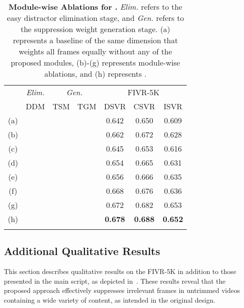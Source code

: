 \documentclass[10pt,twocolumn,letterpaper]{article}
\newcommand{\cmark}{\ding{51}}
\begin{document}
    \begin{table}[!t] \footnotesize
        \centering
        \begin{tabular}{c|ccc|ccc}
            \cmidrule[\heavyrulewidth]{1-7}
            \morecmidrules
            \cmidrule[\heavyrulewidth]{1-7}
\multicolumn{1}{c}{\multirow{2}{*}[-.3em]{}}
            & \multicolumn{1}{|c|}{\textit{Elim.}}  & \multicolumn{2}{c|}{\textit{Gen.}} & \multicolumn{3}{c}{FIVR-5K} \\ \cmidrule(){2-7} 
           
                &\multicolumn{1}{c|}{DDM} & TSM    & TGM    & DSVR  & CSVR  & ISVR  \\ \midrule 
            (a) &       &        &        & 0.642 &	0.650 &	0.609 \\ \midrule
            (b) &\cmark &        &        & 0.662 &	0.672 &	0.628 \\ \midrule
            (c) &       & \cmark &        & 0.645 &	0.653 &	0.616 \\
            (d) &       &        & \cmark & 0.654 &	0.665 &	0.631 \\
            (e) &       & \cmark & \cmark & 0.656 &	0.666 &	0.635 \\ \midrule 
            (f) &\cmark & \cmark &        & 0.668 &	0.676 &	0.636 \\ 
            (g) &\cmark &        & \cmark & 0.672 &	0.682 &	0.653 \\ \midrule
            (h) &\cmark & \cmark & \cmark & \textbf{0.678} & \textbf{0.688} & \textbf{0.652} \\
            \cmidrule[\heavyrulewidth]{1-7}
            \morecmidrules
            \cmidrule[\heavyrulewidth]{1-7}
        \end{tabular}
        \vspace{-0mm}
        \caption{\textbf{Module-wise Ablations for \textbf{.} }\textit{Elim.} refers to the easy distractor elimination stage, and \textit{Gen.} refers to the suppression weight generation stage. (a) represents a baseline of the same dimension that weights all frames equally without any of the proposed modules, (b)-(g) represents module-wise ablations, and (h) represents . \vspace{3mm}}
        \label{tab:module_ablation1024}
    \end{table}
    
    \subsection{Additional Qualitative Results}\label{qual_exp}
        This section describes qualitative results on the FIVR-5K in addition to those presented in the main script, as depicted in~. These results reveal that the proposed approach effectively suppresses irrelevant frames in untrimmed videos containing a wide variety of content, as intended in the original design.
\end{document}
